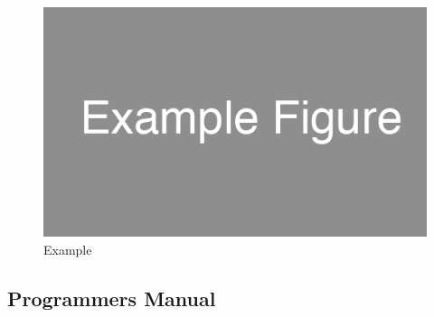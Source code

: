 \documentclass[12pt,letterpaper]{article}
\begin{document}
\begin{figure}
\centering
\includegraphics[scale=0.35]{images/example_figure.png}
\caption{Example}
\label{fig:home}
\end{figure}

\clearpage\null
\subsection{Programmers Manual}

\end{document}
